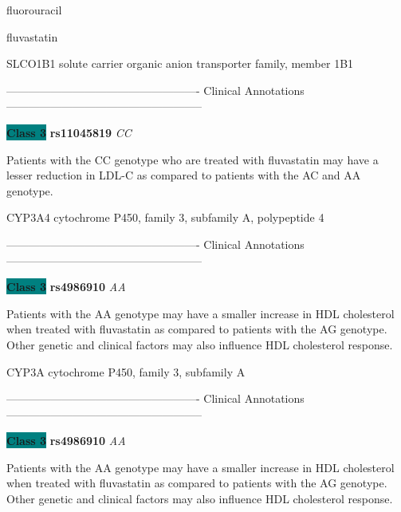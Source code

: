 \documentclass{resume} %
\begin{document}
\begin{rSection}{ fluorouracil }
\end{rSection}\begin{rSection}{ fluvastatin }
\item[]

\begin{rSubsection}{ SLCO1B1 }{ solute carrier organic anion transporter family, member 1B1 }{}{}
\item[]

\item[] ---------------------------------------------------- Clinical Annotations -----------------------------------------------------\newline
\item \textbf{\colorbox{teal} {Class 3}} \textbf{ rs11045819 } \textit{ CC }
\item[] Patients with the CC genotype who are treated with fluvastatin may have a lesser reduction in LDL-C as compared to patients with the AC and AA genotype.
\end{rSubsection}\begin{rSubsection}{ CYP3A4 }{ cytochrome P450, family 3, subfamily A, polypeptide 4 }{}{}
\item[]

\item[] ---------------------------------------------------- Clinical Annotations -----------------------------------------------------\newline
\item \textbf{\colorbox{teal} {Class 3}} \textbf{ rs4986910 } \textit{ AA }
\item[] Patients with the AA genotype may have a smaller increase in HDL cholesterol when treated with fluvastatin as compared to patients with the AG genotype. Other genetic and clinical factors may also influence HDL cholesterol response.
\end{rSubsection}\begin{rSubsection}{ CYP3A }{ cytochrome P450, family 3, subfamily A }{}{}
\item[]

\item[] ---------------------------------------------------- Clinical Annotations -----------------------------------------------------\newline
\item \textbf{\colorbox{teal} {Class 3}} \textbf{ rs4986910 } \textit{ AA }
\item[] Patients with the AA genotype may have a smaller increase in HDL cholesterol when treated with fluvastatin as compared to patients with the AG genotype. Other genetic and clinical factors may also influence HDL cholesterol response.
\end{rSubsection}


\end{rSection}
\end{document}
